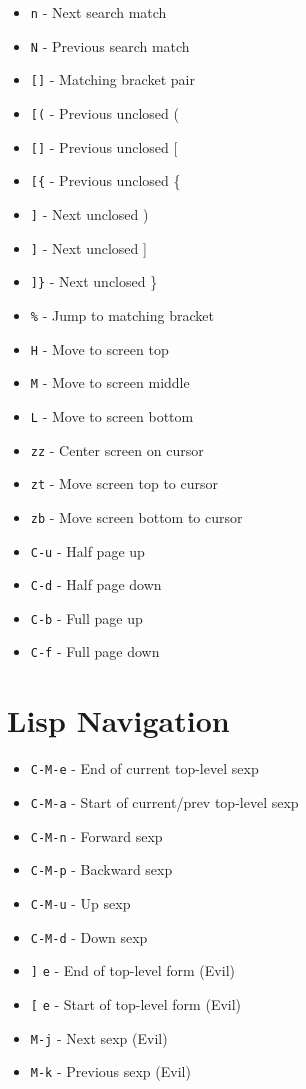\documentclass[6pt,landscape]{article}
\newcommand{\key}[1]{\texttt{#1}}
\begin{document}
\begin{multicols*}{5}
\begin{itemize}
\item \key{n} - Next search match
\item \key{N} - Previous search match
\item \key{[]} - Matching bracket pair
\item \key{[(} - Previous unclosed (
\item \key{[]} - Previous unclosed [
\item \key{[\{} - Previous unclosed \{
\item \key{]\)} - Next unclosed )
\item \key{]\]} - Next unclosed ]
\item \key{]\}} - Next unclosed \}
\item \key{\%} - Jump to matching bracket
\item \key{H} - Move to screen top
\item \key{M} - Move to screen middle
\item \key{L} - Move to screen bottom
\item \key{zz} - Center screen on cursor
\item \key{zt} - Move screen top to cursor
\item \key{zb} - Move screen bottom to cursor
\item \key{C-u} - Half page up
\item \key{C-d} - Half page down
\item \key{C-b} - Full page up
\item \key{C-f} - Full page down
\end{itemize}  

\section*{Lisp Navigation}
\begin{itemize}[leftmargin=*,itemsep=0pt,parsep=0pt,topsep=0pt]
\item \key{C-M-e} - End of current top-level sexp
\item \key{C-M-a} - Start of current/prev top-level sexp
\item \key{C-M-n} - Forward sexp
\item \key{C-M-p} - Backward sexp
\item \key{C-M-u} - Up sexp
\item \key{C-M-d} - Down sexp
\item \key{]} \key{e} - End of top-level form (Evil)
\item \key{[} \key{e} - Start of top-level form (Evil)
\item \key{M-j} - Next sexp (Evil)
\item \key{M-k} - Previous sexp (Evil)
\end{itemize}


\end{multicols*}
\end{document}
